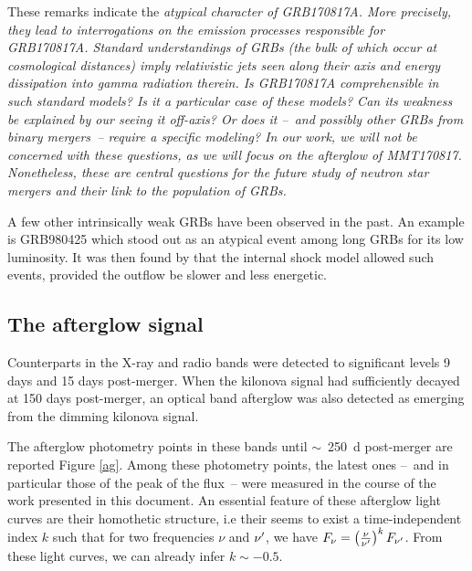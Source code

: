 These remarks indicate the \it{atypical} character of GRB170817A. More precisely, they lead to interrogations on the emission processes responsible for GRB170817A. Standard understandings of GRBs (the bulk of which occur at cosmological distances) imply relativistic jets seen along their axis and energy dissipation into gamma radiation therein. Is GRB170817A comprehensible in such standard models? Is it a particular case of these models? Can its weakness be explained by our seeing it off-axis? Or does it --~and possibly other GRBs from binary mergers~-- require a specific modeling? In our work, we will not be concerned with these questions, as we will focus on the afterglow of MMT170817. Nonetheless, these are central questions for the future study of neutron star mergers and their link to the population of GRBs.

A few other intrinsically weak GRBs have been observed in the past. An example is GRB980425 which stood out as an atypical event among long GRBs for its low luminosity. It was then found by \citet{50} that the internal shock model allowed such events, provided the outflow be slower and less energetic.


\subsection{The afterglow signal}
\label{ags}
Counterparts in the X-ray and radio bands were detected to significant levels 9 days and 15 days post-merger. When the kilonova signal had sufficiently decayed at 150 days post-merger, an optical band afterglow was also detected as emerging from the dimming kilonova signal.

The afterglow photometry points in these bands until $\sim$~250~d post-merger are reported Figure \ref{ag}. Among these photometry points, the latest ones --~and in particular those of the peak of the flux~-- were measured in the course of the work presented in this document. An essential feature of these afterglow light curves are their homothetic structure, i.e their seems to exist a time-independent index $k$ such that for two frequencies $\nu$ and $\nu^{\prime}$, we have $F_\nu = \left( \frac{\nu}{\nu^{\prime}} \right)^k F_{\nu^{\prime}}$. From these light curves, we can already infer $k \sim -0.5$.


